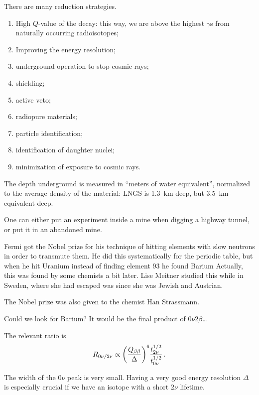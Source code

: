 \documentclass[main.tex]{subfiles}
\begin{document}
There are many reduction strategies. 
\begin{enumerate}
    \item High \(Q\)-value of the decay: this way, we are above the highest 
    \(\gamma \)s from naturally occurring radioisotopes;
    \item Improving the energy resolution;
    \item underground operation to stop cosmic rays;
    \item shielding;
    \item active veto;
    \item radiopure materials;
    \item particle identification;
    \item identification of daughter nuclei;
    \item minimization of exposure to cosmic rays. 
\end{enumerate}

The depth underground is measured in ``meters of water equivalent'', normalized 
to the average density of the material: LNGS is \SI{1.3}{km} deep,
but \SI{3.5}{km}-equivalent deep. 

One can either put an experiment inside a mine when digging a highway tunnel, 
or put it in an abandoned mine. 

Fermi got the Nobel prize for his technique of hitting elements with slow neutrons
in order to transmute them. 
He did this systematically for the periodic table, but when he hit Uranium
instead of finding element 93 he found Barium 
Actually, this was found by some chemists a bit later. 
Lise Meitner studied this while in Sweden, where she had escaped was since 
she was Jewish and Austrian. 

The Nobel prize was also given to the chemist Han Strassmann.  

Could we look for Barium? It would be the final product of \(0 \nu 2 \beta \)\dots


The relevant ratio is 
%
\begin{align}
R_{0 \nu / 2 \nu } \propto \qty(\frac{Q_{\beta \beta }}{\Delta })^6 \frac{t_{2 \nu }^{1/2}}{t^{1/2}_{0 \nu }}
\,.
\end{align}

The width of the \(0 \nu \) peak is very small.
Having a very good energy resolution \(\Delta \) is especially crucial if we have an isotope with a short \(2 \nu \) lifetime. 
\end{document}
